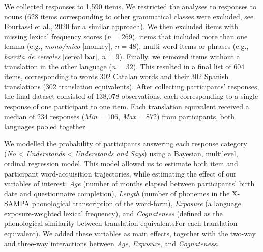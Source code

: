 \documentclass[
]{article}
\begin{document}
We collected responses to 1,590 items. We restricted the analyses to
responses to nouns (628 items corresponding to other grammatical classes
were excluded, see \protect\hyperlink{ref-fourtassi2020growth}{Fourtassi
et al., 2020} for a similar approach). We then excluded items with
missing lexical frequency scores (\emph{n} = 269), items that included
more than one lemma (e.g., \emph{mono/mico} {[}monkey{]}, \emph{n} =
48), multi-word items or phrases (e.g., \emph{barrita de cereales}
{[}cereal bar{]}, \emph{n} = 9). Finally, we removed items without a
translation in the other language (\emph{n} = 32). This resulted in a
final list of 604 items, corresponding to words 302 Catalan words and
their 302 Spanish translations (302 translation equivalents). After
collecting participants' responses, the final dataset consisted of
138,078 observations, each corresponding to a single response of one
participant to one item. Each translation equivalent received a median
of 234 responses (\emph{Min} = 106, \emph{Max} = 872) from participants,
both languages pooled together.

We modelled the probability of participants answering each response
category (\emph{No} \textless{} \emph{Understands} \textless{}
\emph{Understands and Says}) using a Bayesian, multilevel, ordinal
regression model. This model allowed us to estimate both item and
participant word-acquisition trajectories, while estimating the effect
of our variables of interest: \emph{Age} (number of months elapsed
between participants' birth date and questionnaire completion),
\emph{Length} (number of phonemes in the X-SAMPA phonological
transcription of the word-form), \emph{Exposure} (a language
exposure-weighted lexical frequency), and \emph{Cognateness} (defined as
the phonological similarity between translation equivalentsFor each
translation equivalent). We added these variables as main effects,
together with the two-way and three-way interactions between \emph{Age},
\emph{Exposure}, and \emph{Cognateness}.
\end{document}
